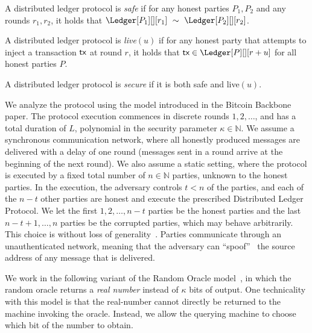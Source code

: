\begin{definition}[Safety]
  A distributed ledger protocol is \emph{safe} if
  for any honest parties $P_1, P_2$ and any rounds $r_1, r_2$, it holds that
  $\Ledger[P_1][][r_1]~\sim~\Ledger[P_2][][r_2]$.
\end{definition}

\begin{definition}[Liveness]
  A distributed ledger protocol is \emph{live}$(u)$ if
  for any honest party that attempts to inject a transaction $\textsf{tx}$
  at round $r$, it holds that $\tx \in \Ledger[P][][r+u]$
  for all honest parties $P$.
\end{definition}

\begin{definition}[Secure]
  A distributed ledger protocol is \emph{secure} if it is
  both safe and live$(u)$.
\end{definition}

We analyze the protocol using the model introduced in the Bitcoin Backbone~\cite{backbone} paper.
The protocol execution commences in discrete rounds $1, 2, \ldots$, and has a total duration of
$L$, polynomial in the security parameter $\kappa \in \mathbb{N}$.
We assume a synchronous communication network, where all honestly produced
messages are delivered with a delay of one round (messages sent in a round
arrive at the beginning of the next round).
We also assume a static setting, where the protocol is executed by
a fixed total number of $n \in \mathbb{N}$ parties, unknown to the honest parties.
In the execution, the adversary controls $t < n$ of the parties,
and each of the $n - t$ other parties are honest and execute the prescribed Distributed Ledger
Protocol. We let the first $1, 2, \ldots, n - t$ parties be the honest parties
and the last $n - t + 1, \ldots, n$ parties be the corrupted parties, which may behave arbitrarily.
This choice is without loss of generality~\cite[Proposition 18]{backbone}.
Parties communicate through an unauthenticated network,
meaning that the adversary can ``spoof''~\cite{douceur2002sybil}
the source address of any message that is delivered.

We work in the following variant of the Random Oracle model~\cite{ro}, in which
the random oracle returns a \emph{real number} instead of $\kappa$ bits of output.
One technicality with this model is that the real-number cannot directly be returned
to the machine invoking the oracle. Instead, we allow the querying machine to choose which
bit of the number to obtain.

